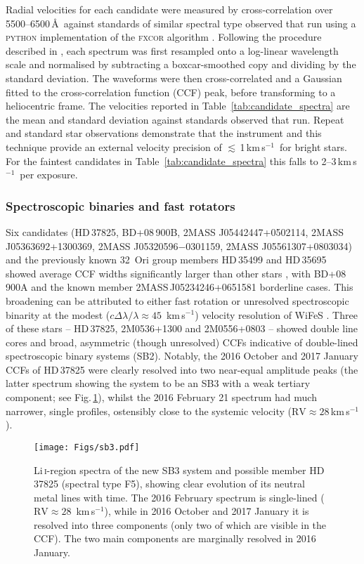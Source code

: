 \documentclass[usenatbib]{mnras}
\newcommand{\kms}{\textrm{km\,s$^{-1}$}}
\begin{document}
Radial velocities for each candidate were measured by
cross-correlation over 5500--6500\,\AA\ against standards of similar
spectral type observed that run using a \textsc{python} implementation
of the \textsc{fxcor} algorithm \citep{Tonry79}. Following the
procedure described in \citet{Murphy15}, each spectrum was first
resampled onto a log-linear wavelength scale and normalised by
subtracting a boxcar-smoothed copy and dividing by the standard
deviation. The waveforms were then cross-correlated and a Gaussian
fitted to the cross-correlation function (CCF) peak, before
transforming to a heliocentric frame. The velocities reported in
Table~\ref{tab:candidate_spectra} are the mean and standard deviation
against standards observed that run. Repeat and standard star
observations demonstrate that the instrument and this technique
provide an external velocity precision of $\lesssim$\,1\,\kms\ for
bright stars. For the faintest candidates in
Table~\ref{tab:candidate_spectra} this falls to 2--3\,\kms\ per
exposure.

\subsubsection{Spectroscopic binaries and fast rotators}
\label{sec:binaries}

Six candidates (HD\,37825, BD+08\,900B, 2MASS J05442447+0502114,
2MASS J05363692+1300369, 2MASS J05320596$-$0301159, 2MASS J05561307+0803034) and the
previously known 32~Ori group members HD\,35499 and HD\,35695 showed
average CCF widths significantly larger than other stars
\citep[$\textrm{FWHM}\gtrsim 2.5$\,px; see][]{Murphy15}, with
BD+08\,900A and the known member 2MASS\,J05234246+0651581 borderline cases.  This broadening can be attributed to
either fast rotation or unresolved spectroscopic binarity at the
modest ($c\Delta\lambda/\lambda\approx45$~\kms) velocity resolution of
WiFeS \citep[see discussion in][]{Murphy15}. Three of these stars --
HD\,37825, 2M0536+1300 and 2M0556+0803 -- showed double line cores and
broad, asymmetric (though unresolved) CCFs indicative of double-lined spectroscopic
binary systems (SB2). Notably, the 2016 October and 2017 January CCFs of HD\,37825 were
clearly resolved into two near-equal amplitude peaks (the latter spectrum showing the system to
be an SB3 with a weak tertiary component; see Fig.\,\ref{fig:sb3}), whilst the 2016
February 21 spectrum had much narrower, single profiles, ostensibly close
to the systemic velocity ($\textrm{RV}\approx28$\,\kms).

\begin{figure}
\centering
\texttt{[image: Figs/sb3.pdf]}
\caption[]{Li\,\textsc{i}-region spectra of the new SB3 system and possible member 
  HD\,37825 (spectral type F5), showing clear evolution of its
  neutral metal lines with time. The 2016 February spectrum is
  single-lined ($\textrm{RV}\approx28$~\kms), while in 2016 October and 2017 January  it is resolved into three components (only two of which are visible in the CCF). The
  two main components are marginally resolved in 2016 January.}
\label{fig:sb3}
\end{figure}
\end{document}
